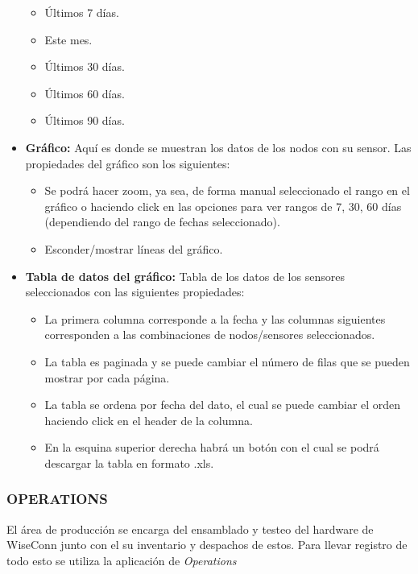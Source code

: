 \begin{itemize}
          \begin{itemize}
              \item Últimos 7 días.
              \item Este mes.
              \item Últimos 30 días.
              \item Últimos 60 días.
              \item Últimos 90 días.
          \end{itemize}
    \item \textbf{Gráfico:} Aquí es donde se muestran los datos de los nodos con su sensor. Las propiedades del gráfico son los siguientes:
          \begin{itemize}
              \item Se podrá hacer zoom, ya sea, de forma manual seleccionado el rango en el gráfico o haciendo click en las opciones para ver rangos de 7, 30, 60 días (dependiendo del rango de fechas seleccionado).
              \item Esconder/mostrar líneas del gráfico.
          \end{itemize}
    \item \textbf{Tabla de datos del gráfico:} Tabla de los datos de los sensores seleccionados con las siguientes propiedades:
          \begin{itemize}
              \item La primera columna corresponde a la fecha y las columnas siguientes corresponden a las combinaciones de nodos/sensores seleccionados.
              \item La tabla es paginada y se puede cambiar el número de filas que se pueden mostrar por cada página.
              \item La tabla se ordena por fecha del dato, el cual se puede cambiar el orden haciendo click en el header de la columna.
              \item En la esquina superior derecha habrá un botón con el cual se podrá descargar la tabla en formato .xls.
          \end{itemize}
\end{itemize}

\subsubsection{OPERATIONS}

El área de producción se encarga del ensamblado y testeo del hardware de WiseConn junto con el su inventario y despachos de estos. Para llevar registro de todo esto se utiliza la aplicación de \textit{Operations}

